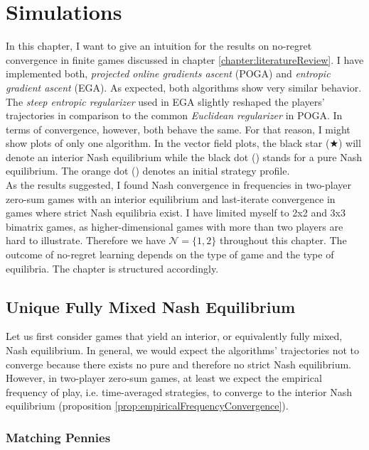
\chapter{Simulations}\label{chapter:simulations}

In this chapter, I want to give an intuition for the results on no-regret convergence in finite games discussed in chapter \ref{chapter:literatureReview}. I have implemented both, \textit{projected online gradients ascent} (POGA) and \textit{entropic gradient ascent} (EGA). As expected, both algorithms show very similar behavior. The \textit{steep entropic regularizer} used in EGA slightly reshaped the players' trajectories in comparison to the common \textit{Euclidean regularizer} in POGA. In terms of convergence, however, both behave the same. For that reason, I might show plots of only one algorithm. In the vector field plots, the black star ($\bigstar$) will denote an interior Nash equilibrium while the black dot ({\Large\textbullet}) stands for a pure Nash equilibrium. The orange dot ({\color[HTML]{E37222}\Large\textbullet}) denotes an initial strategy profile. \\

As the results suggested, I found Nash convergence in frequencies in two-player zero-sum games with an interior equilibrium and last-iterate convergence in games where strict Nash equilibria exist. I have limited myself to 2x2 and 3x3 bimatrix games, as higher-dimensional games with more than two players are hard to illustrate. Therefore we have $\mathcal{N} = \{1,2\}$ throughout this chapter. The outcome of no-regret learning depends on the type of game and the type of equilibria. The chapter is structured accordingly. 

\section{Unique Fully Mixed Nash Equilibrium}\label{section:uniqueMixedNashEquilibrium}

Let us first consider games that yield an interior, or equivalently fully mixed, Nash equilibrium. In general, we would expect the algorithms' trajectories not to converge because there exists no pure and therefore no strict Nash equilibrium. However, in two-player zero-sum games, at least we expect the empirical frequency of play, i.e. time-averaged strategies, to converge to the interior Nash equilibrium (proposition \ref{prop:empiricalFrequencyConvergence}).

\subsection{Matching Pennies}\label{subsection:machtingPennies}


